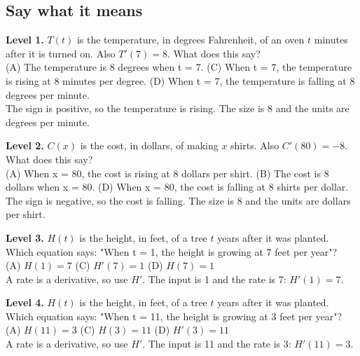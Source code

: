 \documentclass[11pt]{article}
\begin{document}
\subsection*{Say what it means}
\noindent\textbf{Level 1.} $T(t)$ is the temperature, in degrees Fahrenheit, of an oven $t$ minutes after it is turned on. Also $T'(7)=8$. What does this say?\\ (A) The temperature is 8 degrees when t = 7. \quad {} \quad (C) When t = 7, the temperature is rising at 8 minutes per degree. \quad (D) When t = 7, the temperature is falling at 8 degrees per minute.\\  \quad The sign is positive, so the temperature is rising. The size is 8 and the units are degrees per minute.\par\medskip
\noindent\textbf{Level 2.} $C(x)$ is the cost, in dollars, of making $x$ shirts. Also $C'(80)=-8$. What does this say?\\ (A) When x = 80, the cost is rising at 8 dollars per shirt. \quad (B) The cost is 8 dollars when x = 80. \quad {} \quad (D) When x = 80, the cost is falling at 8 shirts per dollar.\\  \quad The sign is negative, so the cost is falling. The size is 8 and the units are dollars per shirt.\par\medskip
\noindent\textbf{Level 3.} $H(t)$ is the height, in feet, of a tree $t$ years after it was planted. Which equation says: "When t = 1, the height is growing at 7 feet per year"?\\ (A) $H(1)=7$ \quad {} \quad (C) $H'(7)=1$ \quad (D) $H(7)=1$\\  \quad A rate is a derivative, so use $H'$. The input is 1 and the rate is 7: $H'(1)=7$.\par\medskip
\noindent\textbf{Level 4.} $H(t)$ is the height, in feet, of a tree $t$ years after it was planted. Which equation says: "When t = 11, the height is growing at 3 feet per year"?\\ (A) $H(11)=3$ \quad {} \quad (C) $H(3)=11$ \quad (D) $H'(3)=11$\\  \quad A rate is a derivative, so use $H'$. The input is 11 and the rate is 3: $H'(11)=3$.\par\medskip
\end{document}
